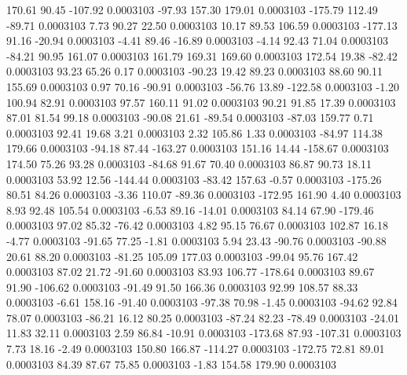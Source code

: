       170.61       90.45     -107.92     0.0003103
      -97.93      157.30      179.01     0.0003103
     -175.79      112.49      -89.71     0.0003103
        7.73       90.27       22.50     0.0003103
       10.17       89.53      106.59     0.0003103
     -177.13       91.16      -20.94     0.0003103
       -4.41       89.46      -16.89     0.0003103
       -4.14       92.43       71.04     0.0003103
      -84.21       90.95      161.07     0.0003103
      161.79      169.31      169.60     0.0003103
      172.54       19.38      -82.42     0.0003103
       93.23       65.26        0.17     0.0003103
      -90.23       19.42       89.23     0.0003103
       88.60       90.11      155.69     0.0003103
        0.97       70.16      -90.91     0.0003103
      -56.76       13.89     -122.58     0.0003103
       -1.20      100.94       82.91     0.0003103
       97.57      160.11       91.02     0.0003103
       90.21       91.85       17.39     0.0003103
       87.01       81.54       99.18     0.0003103
      -90.08       21.61      -89.54     0.0003103
      -87.03      159.77        0.71     0.0003103
       92.41       19.68        3.21     0.0003103
        2.32      105.86        1.33     0.0003103
      -84.97      114.38      179.66     0.0003103
      -94.18       87.44     -163.27     0.0003103
      151.16       14.44     -158.67     0.0003103
      174.50       75.26       93.28     0.0003103
      -84.68       91.67       70.40     0.0003103
       86.87       90.73       18.11     0.0003103
       53.92       12.56     -144.44     0.0003103
      -83.42      157.63       -0.57     0.0003103
     -175.26       80.51       84.26     0.0003103
       -3.36      110.07      -89.36     0.0003103
     -172.95      161.90        4.40     0.0003103
        8.93       92.48      105.54     0.0003103
       -6.53       89.16      -14.01     0.0003103
       84.14       67.90     -179.46     0.0003103
       97.02       85.32      -76.42     0.0003103
        4.82       95.15       76.67     0.0003103
      102.87       16.18       -4.77     0.0003103
      -91.65       77.25       -1.81     0.0003103
        5.94       23.43      -90.76     0.0003103
      -90.88       20.61       88.20     0.0003103
      -81.25      105.09      177.03     0.0003103
      -99.04       95.76      167.42     0.0003103
       87.02       21.72      -91.60     0.0003103
       83.93      106.77     -178.64     0.0003103
       89.67       91.90     -106.62     0.0003103
      -91.49       91.50      166.36     0.0003103
       92.99      108.57       88.33     0.0003103
       -6.61      158.16      -91.40     0.0003103
      -97.38       70.98       -1.45     0.0003103
      -94.62       92.84       78.07     0.0003103
      -86.21       16.12       80.25     0.0003103
      -87.24       82.23      -78.49     0.0003103
      -24.01       11.83       32.11     0.0003103
        2.59       86.84      -10.91     0.0003103
     -173.68       87.93     -107.31     0.0003103
        7.73       18.16       -2.49     0.0003103
      150.80      166.87     -114.27     0.0003103
     -172.75       72.81       89.01     0.0003103
       84.39       87.67       75.85     0.0003103
       -1.83      154.58      179.90     0.0003103
